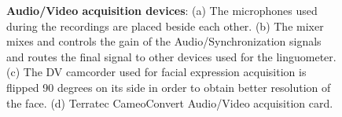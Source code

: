 \begin{figure}
	\centering
		\hspace{0.05\textwidth}

		\hspace{0.05\textwidth}

	\caption[Audio/Video acquisition devices]{\textbf{Audio/Video acquisition devices}:
	(a) The microphones used during the recordings are placed beside each other. (b) The mixer mixes and controls the gain of the
	Audio/Synchronization signals and routes the final signal to other devices
	used for the linguometer.
	(c) The DV camcorder used for facial
	expression acquisition is flipped 90 degrees on	its side in order to obtain
	better resolution of the face.
	(d) Terratec CameoConvert Audio/Video acquisition card.}
	\label{fig:linguometer:av:intro}
\end{figure}
